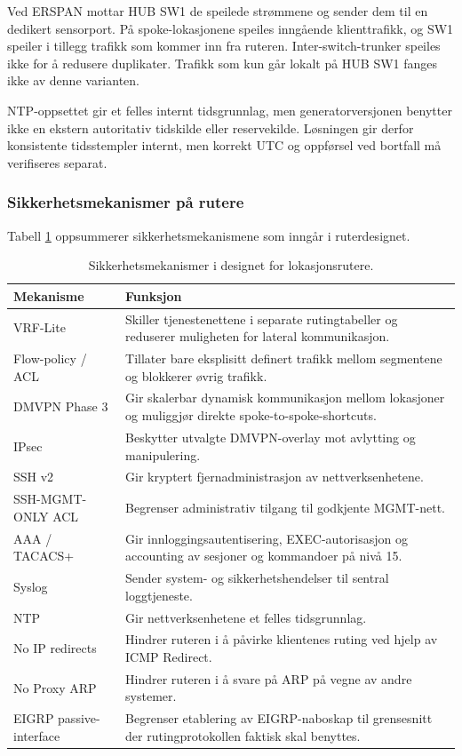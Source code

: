 Ved ERSPAN mottar HUB SW1 de speilede strømmene og sender dem til en dedikert sensorport. På spoke-lokasjonene speiles inngående klienttrafikk, og SW1 speiler i tillegg trafikk som kommer inn fra ruteren. Inter-switch-trunker speiles ikke for å redusere duplikater. Trafikk som kun går lokalt på HUB SW1 fanges ikke av denne varianten.

NTP-oppsettet gir et felles internt tidsgrunnlag, men generatorversjonen benytter ikke en ekstern autoritativ tidskilde eller reservekilde. Løsningen gir derfor konsistente tidsstempler internt, men korrekt UTC og oppførsel ved bortfall må verifiseres separat.

\subsubsection{Sikkerhetsmekanismer på rutere}
Tabell \ref{tab:router-security} oppsummerer sikkerhetsmekanismene som inngår i ruterdesignet.

\begin{table}[H]
\centering
\caption{Sikkerhetsmekanismer i designet for lokasjonsrutere.}
\vspace{5pt}
\small
\setlength{\tabcolsep}{6pt}
\begin{tabular}{>{\raggedright\arraybackslash}p{3.8cm}>{\raggedright\arraybackslash}p{9.9cm}}
\toprule
\rowcolor{tablegreen}
\color{white}\textbf{Mekanisme} & \color{white}\textbf{Funksjon} \\
\midrule
VRF-Lite &
Skiller tjenestenettene i separate rutingtabeller og reduserer muligheten for lateral kommunikasjon. \\
Flow-policy / ACL &
Tillater bare eksplisitt definert trafikk mellom segmentene og blokkerer øvrig trafikk. \\
DMVPN Phase 3 &
Gir skalerbar dynamisk kommunikasjon mellom lokasjoner og muliggjør direkte spoke-to-spoke-shortcuts. \\
IPsec &
Beskytter utvalgte DMVPN-overlay mot avlytting og manipulering. \\
SSH v2 &
Gir kryptert fjernadministrasjon av nettverksenhetene. \\
SSH-MGMT-ONLY ACL &
Begrenser administrativ tilgang til godkjente MGMT-nett. \\
AAA / TACACS+ &
Gir innloggingsautentisering, EXEC-autorisasjon og accounting av sesjoner og kommandoer på nivå 15. \\
Syslog &
Sender system- og sikkerhetshendelser til sentral loggtjeneste. \\
NTP &
Gir nettverksenhetene et felles tidsgrunnlag. \\
No IP redirects &
Hindrer ruteren i å påvirke klientenes ruting ved hjelp av ICMP Redirect. \\
No Proxy ARP &
Hindrer ruteren i å svare på ARP på vegne av andre systemer. \\
EIGRP passive-interface &
Begrenser etablering av EIGRP-naboskap til grensesnitt der rutingprotokollen faktisk skal benyttes. \\
\bottomrule
\end{tabular}
\label{tab:router-security}
\end{table}

